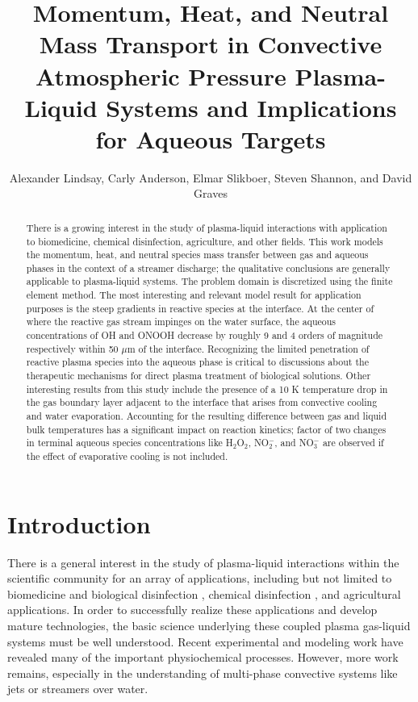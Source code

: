 \documentclass[12pt]{article}
\title{Momentum, Heat, and Neutral Mass Transport in Convective Atmospheric Pressure Plasma-Liquid Systems and Implications for Aqueous Targets}
\author{Alexander Lindsay, Carly Anderson, Elmar Slikboer, Steven Shannon, and David Graves}
\begin{document}
\maketitle

\begin{abstract}

There is a growing interest in the study of plasma-liquid interactions with application to biomedicine, chemical disinfection, agriculture, and other fields. This work models the momentum, heat, and neutral species mass transfer between gas and aqueous phases in the context of a streamer discharge; the qualitative conclusions are generally applicable to plasma-liquid systems. The problem domain is discretized using the finite element method. The most interesting and relevant model result for application purposes is the steep gradients in reactive species at the interface. At the center of where the reactive gas stream impinges on the water surface, the aqueous concentrations of OH and ONOOH decrease by roughly 9 and 4 orders of magnitude respectively within 50 $\mu$m of the interface. Recognizing the limited penetration of reactive plasma species into the aqueous phase is critical to discussions about the therapeutic mechanisms for direct plasma treatment of  biological solutions. Other interesting results from this study include the presence of a 10 K temperature drop in the gas boundary layer adjacent to the interface that arises from convective cooling and water evaporation. Accounting for the resulting difference between gas and liquid bulk temperatures has a significant impact on reaction kinetics; factor of two changes in terminal aqueous species concentrations like H$_2$O$_2$, NO$_2^-$, and NO$_3^-$ are observed if the effect of evaporative cooling is not included.
    
\end{abstract}

\section{Introduction}

There is a general interest in the study of plasma-liquid interactions within the
scientific community for an array of applications, including but not limited to biomedicine and biological disinfection \cite{Kong2009b,Laroussi2009,Shimizu2014c,VonWoedtke2014a,VonWoedtke2013a,Joubert2013a}, chemical disinfection \cite{Johnson2006,Locke2006,Theron2008}, and agricultural applications. \cite{Park2013b,Lindsay2014} In order to successfully realize these applications and develop mature technologies, the basic science underlying these coupled plasma gas-liquid systems must be well understood. Recent experimental \cite{Lukes2014b,Bruggeman2009d,Pavlovich2013g,Traylor2011h} and modeling work \cite{Babaeva2014b,Tian2014,Chen2014a} have revealed many of the important physiochemical processes. However, more work remains, especially in the understanding of multi-phase convective systems like jets or streamers over water.
\end{document}
